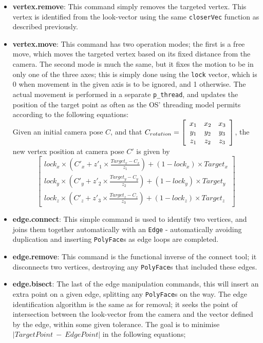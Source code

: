 \documentclass[a4paper,10pt]{article}
\begin{document}
\begin{itemize}
{Therefore, with arbitrary vectors $A$ and $B$, $A ~<~ B~$ iff \\$~(A - O ~\times~ A - V) ~~<~~ (B - O ~\times~ B - V)$. \\
}
\item{\textbf{vertex.remove}: This command simply removes the targeted vertex. This vertex is identified from the look-vector using the same \texttt{closerVec} function as described previously.}
\item{\textbf{vertex.move}: This command has two operation modes; the first is a free move, which moves the targeted vertex based on its fixed distance from the camera. The second mode is much the same, but it fixes the motion to be in only one of the three axes; this is simply done using the \texttt{lock} vector, which is 0 when movement in the given axis is to be ignored, and 1 otherwise. The actual movement is performed in a separate \texttt{p\_thread}, and updates the position of the target point as often as the OS' threading model permits according to the following equations:
\\

Given an initial camera pose $C$, and that $C_{rotation} = \left[
  \begin{array}{c c c}
    x_1 & x_2 & x_3 \\
    y_1 & y_2 & y_3 \\
    z_1 & z_2 & z_3
  \end{array}\right]$, the new vertex position at camera pose $C'$ is given by 
\\

$$\displaystyle \left[ 
  \begin{array}{c}
    lock_x \times (C'_x + z'_1 \times \frac{Target_x - C_x}{z_1}) + (1 - lock_x) \times Target_x \\ 
    lock_y \times (C'_y + z'_2 \times \frac{Target_y - C_y}{z_2}) + (1 - lock_y) \times Target_y \\ 
    lock_z \times (C'_z + z'_3 \times \frac{Target_z - C_z}{z_3}) + (1 - lock_z) \times Target_z
  \end{array}\right]$$
}
\item{\textbf{edge.connect}: This simple command is used to identify two vertices, and joins them together automatically with an \texttt{Edge} - automatically avoiding duplication and inserting \texttt{PolyFace}s as edge loops are completed.}
\item{\textbf{edge.remove}: This command is the functional inverse of the connect tool; it disconnects two vertices, destroying any \texttt{PolyFace}s that included these edges.}
\item{\textbf{edge.bisect}: The last of the edge manipulation commands, this will insert an extra point on a given edge, splitting any \texttt{PolyFace}s on the way. The edge identification algorithm is the same as for removal; it seeks the point of intersection between the look-vector from the camera and the vector defined by the edge, within some given tolerance. The goal is to minimise $|TargetPoint ~-~ EdgePoint|$ in the following equations;
\\	
        
}
\end{itemize}
\end{document}
